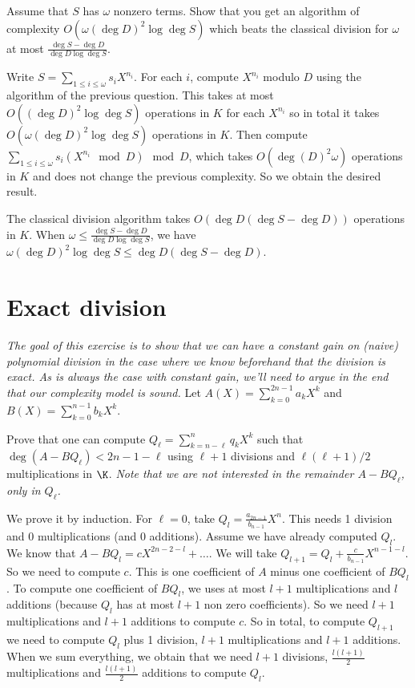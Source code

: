 \documentclass[11pt]{exam}
\theoremstyle{definition}
\begin{document}
{\begin{questions}
\question Assume that $S$ has $\omega$ nonzero terms. Show that you get an algorithm of complexity $O(\omega (\deg D)^2\log \deg S)$ which beats the classical division for $ \omega$ at most  $\frac{\deg S-\deg D}{\deg D \log \deg S}$.

\begin{solution}
Write $S = \sum_{1 \leq i \leq \omega} s_i X^{n_i}$. For each $i$, compute $X^{n_i}$ modulo $D$ using the algorithm of the previous question. This takes at most $O((\deg D)^2 \log \deg S)$ operations in $K$ for each $X^{n_i}$ so in total it takes $O(\omega (\deg D)^2\log \deg S)$ operations in $K$. Then compute $\sum_{1 \leq i \leq \omega} s_i (X^{n_i} \mod D) \mod D$, which takes $O(\deg(D)^2 \omega)$ operations in $K$ and does not change the previous complexity. So we obtain the desired result.

The classical division algorithm takes $O(\deg D (\deg S-\deg D) )$ operations in $K$. When $\omega \leq \frac{\deg S-\deg D}{\deg D \log \deg S}$, we have $\omega (\deg D)^2\log \deg S \leq \deg D (\deg S -\deg D)$.
\end{solution}
\end{questions}

\section{Exact division}

{\sl The goal of this exercise is to show that we can have a constant
  gain on (naive) polynomial division in the case where we know
  beforehand that the division is exact. As is always the case with
  constant gain, we'll need to argue in the end that our complexity
  model is sound.}
\medskip
Let $A(X) = \sum_{k=0}^{2n-1} a_k X^k$ and $B(X) = \sum_{k=0}^{n-1} b_k X^k$.


\begin{questions}
\question Prove that one can compute $Q_\ell =
\sum_{k=n-\ell}^{n} q_k X^k$ such that $\deg (A - BQ_{\ell}) <
2n-1-\ell$ using $\ell + 1$ divisions and $\ell (\ell + 1)/2$
multiplications in $\K$.
{\sl Note that we are not interested in the remainder $A - BQ_{\ell}$, only in $Q_{\ell}$.}

\begin{solution}
We prove it by induction. For $\ell = 0$, take $Q_l = \frac{a_{2n-1}}{b_{n-1}} X^n$. This needs 1 division and 0 multiplications (and 0 additions).
Assume we have already computed $Q_l$. We know that $A-BQ_l = c X^{2n-2-l} + \dots$. We will take $Q_{l+1} = Q_l + \frac{c}{b_{n-1}}X^{n-1-l}$. So we need to compute $c$. This is one coefficient of $A$ minus one coefficient of $BQ_l$. To compute one coefficient of $BQ_l$, we uses at most $l+1$ multiplications and $l$ additions (because $Q_l$ has at most $l+1$ non zero coefficients). So we need $l+1$ multiplications and $l+1$ additions to compute $c$. So in total, to compute $Q_{l+1}$ we need to compute $Q_l$ plus 1 division, $l+1$ multiplications and $l+1$ additions. When we sum everything, we obtain that we need $l+1$ divisions, $\frac{l(l+1)}{2}$ multiplications and $\frac{l(l+1)}{2}$ additions to compute $Q_l$.
\end{solution}


\end{questions}}
\end{document}
